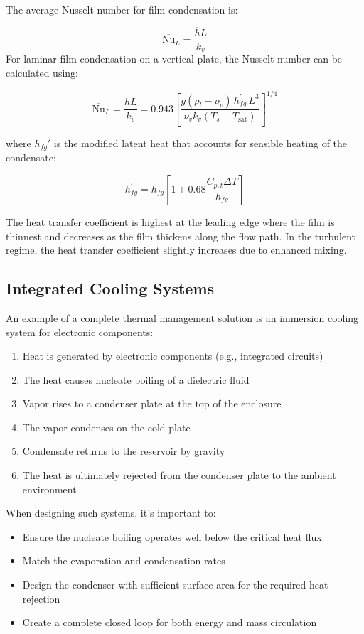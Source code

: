 \begin{definition}
The average Nusselt number for film condensation is:

\[
    \overline{\text{Nu}}_L = \frac{\overline{h}L}{k_v}
\]
%
For laminar film condensation on a vertical plate, the Nusselt number can be calculated using:

\[
    \overline{\text{Nu}}_L = \frac{\overline{h}L}{k_v} =  0.943\left[\frac{g\left(\rho_l-\rho_v\right) \,h_{fg}^{\prime}\, L^3}{\nu_v k_v\left(T_s-T_{\mathrm{sat}}\right)}\right]^{1 / 4}
\]

where $h_{fg}'$ is the modified latent heat that accounts for sensible heating of the condensate:

\[
    h_{f g}^{\prime}=h_{f g}\left[1+0.68 \frac{C_{p, t} \Delta T}{h_{f g}}\right]
\]
\end{definition}

The heat transfer coefficient is highest at the leading edge where the film is thinnest and decreases as the film thickens along the flow path. In the turbulent regime, the heat transfer coefficient slightly increases due to enhanced mixing.
\subsection*{Integrated Cooling Systems}
An example of a complete thermal management solution is an immersion cooling system for electronic components:

\begin{enumerate}
    \item Heat is generated by electronic components (e.g., integrated circuits)
    \item The heat causes nucleate boiling of a dielectric fluid
    \item Vapor rises to a condenser plate at the top of the enclosure
    \item The vapor condenses on the cold plate
    \item Condensate returns to the reservoir by gravity
    \item The heat is ultimately rejected from the condenser plate to the ambient environment
\end{enumerate}

When designing such systems, it's important to:
\begin{itemize}
    \item Ensure the nucleate boiling operates well below the critical heat flux
    \item Match the evaporation and condensation rates
    \item Design the condenser with sufficient surface area for the required heat rejection
    \item Create a complete closed loop for both energy and mass circulation
\end{itemize}
